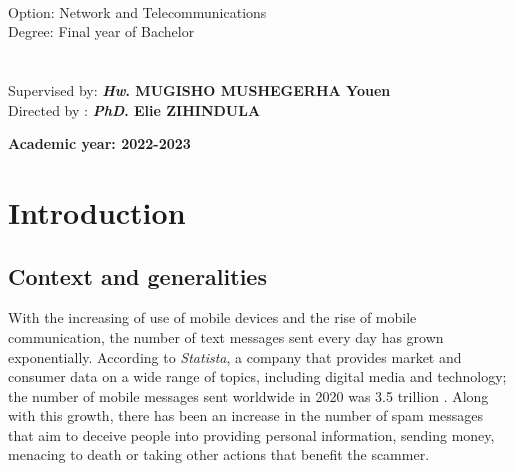 \documentclass[12pt,a4paper]{report}
\begin{document}
\begin{titlepage}
\begin {minipage}{0.5 \textwidth }
\begin{flushright}
{\begin{tabbing}
				\vspace*{0.3cm}\\
				\hspace*{2cm} Option: Network and Telecommunications\\					
				\hspace*{2cm} Degree: Final year of Bachelor\\ 
				\vspace*{2cm}\\
				\\
				\hspace*{2cm}Supervised by: \textbf{\textit{Hw}. MUGISHO MUSHEGERHA Youen }\\
				\hspace*{2cm}Directed by : \textbf{\textit{PhD}. Elie ZIHINDULA}			
			\end{tabbing}
		}					

	\end{flushright}
\end{minipage}
\begin{center}
\end{center}

\begin{center} 
	\huge{\textbf{Academic year: 2022-2023}}
\end{center}
\end{titlepage} 
	\tableofcontents 
	\listoffigures
	\listoftables
	
	\newpage
	

	\chapter*{Introduction}
	\section{Context and generalities} 
	With the increasing of use of mobile devices and the rise of mobile communication, the number of text messages sent every day has grown exponentially. According to \textit{Statista}, a company that provides market and consumer data on a wide range of topics, including digital media and technology; the number of mobile messages sent worldwide in 2020 was 3.5 trillion \cite{Statista2020}. Along with this growth, there has been an increase in the number of spam messages that aim to deceive people into providing personal information, sending money, menacing to death or taking other actions that benefit the scammer.\\
	
\end{document}
